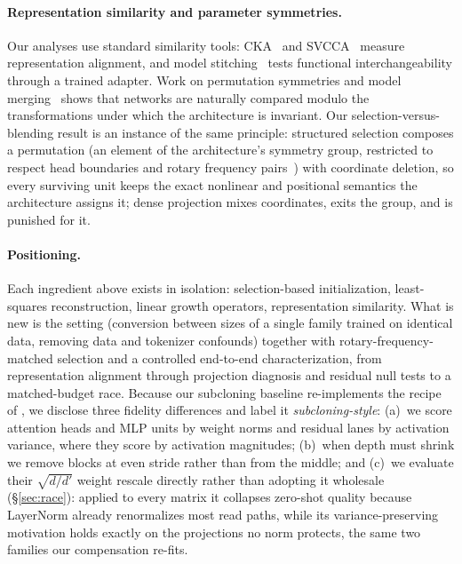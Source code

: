 \paragraph{Representation similarity and parameter symmetries.}
Our analyses use standard similarity tools:
CKA~\citep{kornblith2019similarity} and SVCCA~\citep{raghu2017svcca} measure
representation alignment, and model
stitching~\citep{lenc2015understanding,bansal2021revisiting} tests functional
interchangeability through a trained adapter. Work on permutation symmetries and
model merging~\citep{ainsworth2023git} shows that networks are naturally compared
modulo the transformations under which the architecture is invariant. Our
selection-versus-blending result is an instance of the same principle: structured
selection composes a permutation (an element of the architecture's symmetry
group, restricted to respect head boundaries and rotary frequency
pairs~\citep{su2024roformer}) with coordinate deletion, so every surviving unit
keeps the exact nonlinear and positional semantics the architecture assigns it;
dense projection mixes coordinates, exits the group, and is punished for it.

\paragraph{Positioning.}
Each ingredient above exists in isolation: selection-based initialization,
least-squares reconstruction, linear growth operators, representation similarity.
What is new is the setting (conversion between sizes of a single family
trained on identical data, removing data and tokenizer confounds) together with
rotary-frequency-matched selection and a controlled end-to-end characterization,
from representation alignment through projection diagnosis and residual null tests
to a matched-budget race. Because our subcloning baseline re-implements the recipe
of \citet{samragh2023weight}, we disclose three fidelity differences and label it
\emph{subcloning-style}: (a)~we score attention heads and MLP units by weight
norms and residual lanes by activation variance, where they score by activation
magnitudes; (b)~when depth must shrink we remove blocks at even stride rather than
from the middle; and (c)~we evaluate their $\sqrt{d/d'}$ weight rescale directly
rather than adopting it wholesale (\S\ref{sec:race}): applied to every matrix it
collapses zero-shot quality because LayerNorm already renormalizes most read
paths, while its variance-preserving motivation holds exactly on the projections
no norm protects, the same two families our compensation re-fits.
